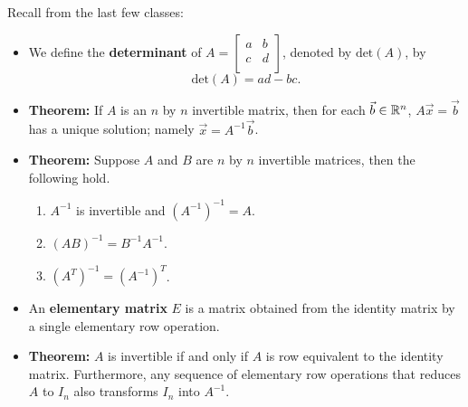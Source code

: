 \documentclass[12pt,letterpaper]{article}
\begin{document}
\thispagestyle{fancy}

Recall from the last few classes:

\begin{itemize}
\item We define the {\bf determinant} of $A=\begin{bmatrix} a & b \\ c & d\\ \end{bmatrix}$, denoted by $\text{det}(A)$, by $$\text{det}(A)=ad-bc.$$
\item {\bf Theorem:} If $A$ is an $n$ by $n$ invertible matrix, then for each $\vec{b}\in \mathbb{R}^n$, $A\vec{x}=\vec{b}$ has a unique solution; namely $\vec{x}=A^{-1}\vec{b}$.
\item {\bf Theorem:} Suppose $A$ and $B$ are $n$ by $n$ invertible matrices, then the following hold. 
\begin{enumerate}
\item $A^{-1}$ is invertible and $(A^{-1})^{-1}=A$.
\item $(AB)^{-1}=B^{-1} A^{-1}$.
\item $(A^{T})^{-1}=(A^{-1})^{T}$.
\end{enumerate}
\item An {\bf elementary matrix} $E$ is a matrix obtained from the identity matrix by a single elementary row operation.
 \item {\bf Theorem:} $A$ is invertible if and only if $A$ is row equivalent to the identity matrix. Furthermore, any sequence of elementary row operations that reduces $A$ to $I_n$ also transforms $I_n$ into $A^{-1}$.
\end{itemize}

\newpage
\end{document}
